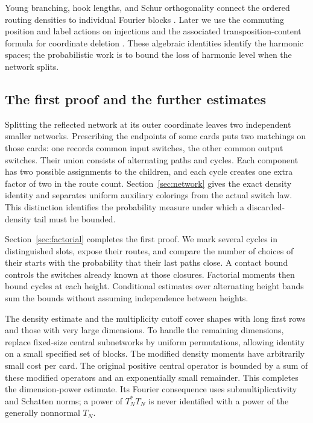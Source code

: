 Young branching, hook lengths, and Schur orthogonality connect the
ordered routing densities to individual Fourier blocks
\cite{Sagan2001,Stanley1999,VershikOkounkov2005}.
Later we use the commuting position and label actions on injections
\cite[Section 3.2]{DukesIhringerLindzey2020} and the associated
transposition-content formula for coordinate deletion
\cite[Lemma 3.1 and Theorem 3.5]{AraujoBratten2017}.
These algebraic identities identify the harmonic spaces; the
probabilistic work is to bound the loss of harmonic level when the
network splits.

\subsection{The first proof and the further estimates}
Splitting the reflected network at its outer coordinate leaves two
independent smaller networks. Prescribing the endpoints of some cards
puts two matchings on those cards: one records common input switches,
the other common output switches. Their union consists of alternating
paths and cycles. Each component has two possible assignments to the
children, and each cycle creates one extra factor of two in the route
count. Section~\ref{sec:network} gives the exact density identity and
separates uniform auxiliary colorings from the actual switch law.
This distinction identifies the probability measure under which a
discarded-density tail must be bounded.

Section~\ref{sec:factorial} completes the first proof. We mark several
cycles in distinguished slots, expose their routes, and compare the
number of choices of their starts with the probability that their last
paths close. A contact bound controls the switches already known at
those closures. Factorial moments then bound cycles at each height.
Conditional estimates over alternating height bands sum the bounds
without assuming independence between heights.

The density estimate and the multiplicity cutoff cover shapes with
long first rows and those with very large dimensions. To handle the
remaining dimensions, replace fixed-size central subnetworks by
uniform permutations, allowing identity on a small specified set of
blocks. The modified density moments have arbitrarily small cost per
card. The original positive central operator is bounded by a sum of
these modified operators and an exponentially small remainder.
This completes the dimension-power estimate. Its Fourier consequence
uses submultiplicativity and Schatten norms; a power of $T_N^*T_N$ is
never identified with a power of the generally nonnormal $T_N$.

